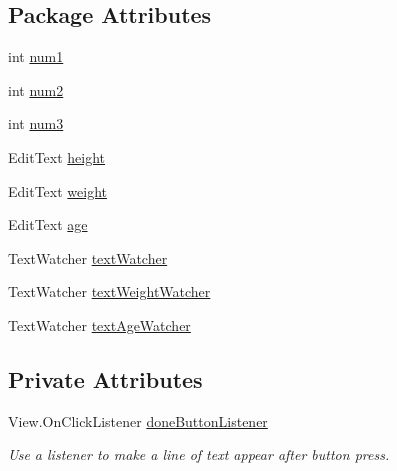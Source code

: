 \subsection*{Package Attributes}
\begin{DoxyCompactItemize}
\item 
int \mbox{\hyperlink{classcom_1_1example_1_1trainawearapplication_1_1_setup_a3f5f0fc63015702187f8dd41e71d9215}{num1}}
\item 
int \mbox{\hyperlink{classcom_1_1example_1_1trainawearapplication_1_1_setup_aaa0aed2e4a8e2c8481a48633bc56a375}{num2}}
\item 
int \mbox{\hyperlink{classcom_1_1example_1_1trainawearapplication_1_1_setup_a58567977937de053f879ad55f1ec71c2}{num3}}
\item 
Edit\+Text \mbox{\hyperlink{classcom_1_1example_1_1trainawearapplication_1_1_setup_aaddeb9d59e10aa2c72c8ec8ed01a2696}{height}}
\item 
Edit\+Text \mbox{\hyperlink{classcom_1_1example_1_1trainawearapplication_1_1_setup_a6b9eeba272f351670a4f46c51e485ebb}{weight}}
\item 
Edit\+Text \mbox{\hyperlink{classcom_1_1example_1_1trainawearapplication_1_1_setup_a6a433af5ff4ce9c333fceeb78c680f37}{age}}
\item 
Text\+Watcher \mbox{\hyperlink{classcom_1_1example_1_1trainawearapplication_1_1_setup_a5aa0a607f294553110e94755d83ee3e9}{text\+Watcher}}
\item 
Text\+Watcher \mbox{\hyperlink{classcom_1_1example_1_1trainawearapplication_1_1_setup_a5115444305047cbe985969e5ab4c53ff}{text\+Weight\+Watcher}}
\item 
Text\+Watcher \mbox{\hyperlink{classcom_1_1example_1_1trainawearapplication_1_1_setup_afb28006669ec92495fc2f90b36c1c630}{text\+Age\+Watcher}}
\end{DoxyCompactItemize}
\subsection*{Private Attributes}
\begin{DoxyCompactItemize}
\item 
View.\+On\+Click\+Listener \mbox{\hyperlink{classcom_1_1example_1_1trainawearapplication_1_1_setup_a6e717a2baaf80c283f516c044ae98e6c}{done\+Button\+Listener}}
\begin{DoxyCompactList}\small\item\em Use a listener to make a line of text appear after button press. \end{DoxyCompactList}\end{DoxyCompactItemize}


